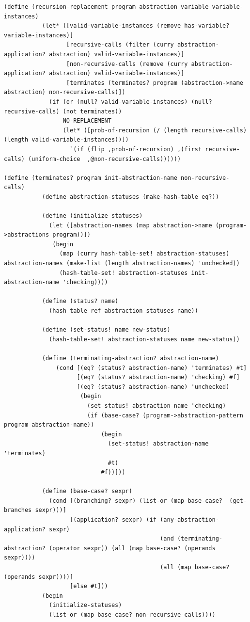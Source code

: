\documentclass[a4paper,10pt]{article}
\begin{document}
\begin{lstlisting}[frame=trBL]
(define (recursion-replacement program abstraction variable variable-instances)
           (let* ([valid-variable-instances (remove has-variable? variable-instances)]
                  [recursive-calls (filter (curry abstraction-application? abstraction) valid-variable-instances)]
                  [non-recursive-calls (remove (curry abstraction-application? abstraction) valid-variable-instances)]
                  [terminates (terminates? program (abstraction->name abstraction) non-recursive-calls)]) 
             (if (or (null? valid-variable-instances) (null? recursive-calls) (not terminates))
                 NO-REPLACEMENT
                 (let* ([prob-of-recursion (/ (length recursive-calls) (length valid-variable-instances))])
                   `(if (flip ,prob-of-recursion) ,(first recursive-calls) (uniform-choice  ,@non-recursive-calls))))))

(define (terminates? program init-abstraction-name non-recursive-calls)
           (define abstraction-statuses (make-hash-table eq?))

           (define (initialize-statuses)
             (let ([abstraction-names (map abstraction->name (program->abstractions program))])
              (begin
                (map (curry hash-table-set! abstraction-statuses) abstraction-names (make-list (length abstraction-names) 'unchecked))
                (hash-table-set! abstraction-statuses init-abstraction-name 'checking))))

           (define (status? name)
             (hash-table-ref abstraction-statuses name))

           (define (set-status! name new-status)
             (hash-table-set! abstraction-statuses name new-status))
           
           (define (terminating-abstraction? abstraction-name)
               (cond [(eq? (status? abstraction-name) 'terminates) #t]
                     [(eq? (status? abstraction-name) 'checking) #f]
                     [(eq? (status? abstraction-name) 'unchecked)
                      (begin
                        (set-status! abstraction-name 'checking)
                        (if (base-case? (program->abstraction-pattern program abstraction-name))
                            (begin
                              (set-status! abstraction-name 'terminates)
                              #t)
                            #f))]))
           
           (define (base-case? sexpr)
             (cond [(branching? sexpr) (list-or (map base-case?  (get-branches sexpr)))]
                   [(application? sexpr) (if (any-abstraction-application? sexpr)
                                             (and (terminating-abstraction? (operator sexpr)) (all (map base-case? (operands sexpr))))
                                             (all (map base-case? (operands sexpr))))]
                   [else #t]))
           (begin
             (initialize-statuses)
             (list-or (map base-case? non-recursive-calls))))
\end{lstlisting}
\end{document}
